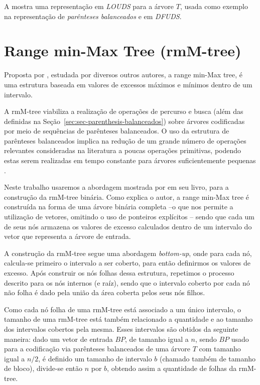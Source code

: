 A  mostra uma representação em \textit{LOUDS} para a árvore $T$, usada como exemplo na representação de \textit{parênteses balanceados} e em \textit{DFUDS}.

\section{Range min-Max Tree (rmM-tree)}\label{sec:sec-classic-rmm-tree}
Proposta por \citet{paper-fully-functinal-succint-trees}, estudada por diversos outros autores, a range min-Max tree, é uma estrutura baseada em valores de excessos máximos e mínimos dentro de um intervalo. 

A rmM-tree viabiliza a realização de operações de percurso e busca (além das definidas na Seção~\ref{sec:sec-parenthesis-balanceados}) sobre árvores codificadas por meio de sequências de parênteses balanceados. O uso da estrutura de parênteses balanceados implica na redução de um grande número de operações relevantes consideradas na literatura a poucas operações primitivas, podendo estas serem realizadas em tempo constante para árvores suficientemente pequenas \citep{paper-fully-functinal-succint-trees}.

Neste trabalho usaremos a abordagem mostrada por \citet{book-compact-data-structures} em seu livro, para a construção da rmM-tree binária. Como explica o autor, a range min-Max tree é construída na forma de uma árvore binária completa --o que nos permite a utilização de vetores, omitindo o uso de ponteiros explícitos -- sendo que cada um de seus nós armazena os valores de excesso calculados dentro de um intervalo do vetor que representa a árvore de entrada. 

A construção da rmM-tree segue uma abordagem \textit{bottom-up}, onde para cada nó, calcula-se primeiro o intervalo a ser coberto, para então definirmos os  valores de excesso. Após construir os nós folhas dessa estrutura, repetimos o processo descrito para os nós internos (e raíz), sendo que o intervalo coberto por cada nó não folha é dado pela união da área coberta pelos seus nós filhos.

Como cada nó folha de uma rmM-tree está associado a um único intervalo, o tamanho de uma rmM-tree está também relacionado a quantidade e ao tamanho dos intervalos cobertos pela mesma. 
Esses intervalos são obtidos da seguinte maneira: dado um vetor de entrada $BP$, de  tamanho igual a $n$, sendo $BP$ usado para a codificação via parênteses balanceados de uma árvore $T$ com tamanho igual a $n/2$, é definido um tamanho de intervalo $b$ (chamado também de tamanho de bloco), divide-se então $n$ por $b$, obtendo assim a quantidade de folhas da rmM-tree.

